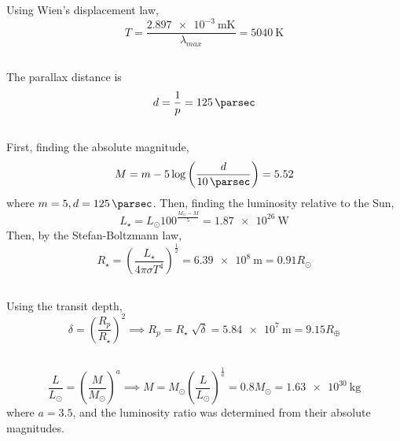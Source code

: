 \documentclass{article}
\begin{document}
Using Wien's displacement law,
\begin{equation}
    T = \frac{\SI{2.897e-3}{\meter\kelvin}}{\lambda_{max}} = \SI{5040}{\kelvin}
\end{equation}

\subsection{}

The parallax distance is
\begin{equation}
    d = \frac{1}{p} = \SI{125}{\parsec}
\end{equation}

\subsection{}

First, finding the absolute magnitude,
\begin{equation}
    M = m - 5 \log\left(\frac{d}{\SI{10}{\parsec}}\right) = \num{5.52}
\end{equation}
where \(m = 5, d = \SI{125}{\parsec}\).
Then, finding the luminosity relative to the Sun,
\begin{equation}
    L_\star = L_\odot 100^{\frac{M_\odot - M}{5}} = \SI{1.87e26}{\watt}
\end{equation}
Then, by the Stefan-Boltzmann law,
\begin{equation}
    R_\star = \left(\frac{L_\star}{4 \pi \sigma T^4}\right)^{\frac{1}{2}} = \SI{6.39e+8}{\meter} = 0.91 R_\odot
\end{equation}

\subsection{}

Using the transit depth,
\begin{equation}
    \delta = \left(\frac{R_p}{R_\star}\right)^2 \implies R_p = R_\star \sqrt[]{\delta} = \SI{5.84e+7}{\meter} = 9.15 R_\oplus
\end{equation}

\subsection{}

\begin{equation}
    \frac{L}{L_\odot} = \left(\frac{M}{M_\odot}\right)^a \implies M = M_\odot \left(\frac{L}{L_\odot}\right)^\frac{1}{a} = 0.8 M_\odot = \SI{1.63e+30}{\kilogram}
\end{equation}
where \(a = 3.5\), and the luminosity ratio was determined from their absolute magnitudes.
\end{document}
